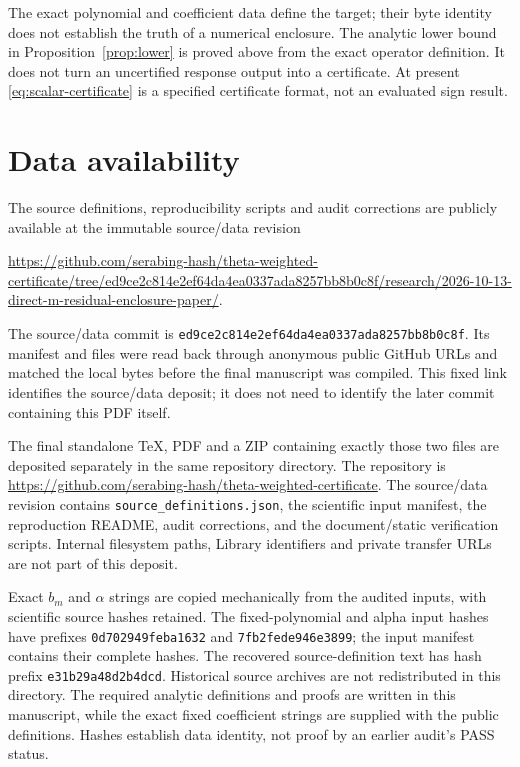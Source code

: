 \documentclass[11pt,a4paper]{article}
\theoremstyle{remark}
\numberwithin{equation}{section}
\begin{document}
The exact polynomial and coefficient data define the target; their byte
identity does not establish the truth of a numerical enclosure. The analytic
lower bound in Proposition~\ref{prop:lower} is proved above from the exact
operator definition. It does not turn an uncertified response output into
a certificate. At present \eqref{eq:scalar-certificate} is a specified
certificate format, not an evaluated sign result.

\section{Data availability}\label{sec:availability}
The source definitions, reproducibility scripts and audit corrections are
publicly available at the immutable source/data revision
\begin{center}
\url{https://github.com/serabing-hash/theta-weighted-certificate/tree/ed9ce2c814e2ef64da4ea0337ada8257bb8b0c8f/research/2026-10-13-direct-m-residual-enclosure-paper/}.
\end{center}
The source/data commit is
\texttt{ed9ce2c814e2ef64da4ea0337ada8257bb8b0c8f}.
Its manifest and files were read back through anonymous public GitHub URLs
and matched the local bytes before the final manuscript was compiled.
This fixed link identifies the source/data deposit; it does not need to
identify the later commit containing this PDF itself.

The final standalone TeX, PDF and a ZIP containing exactly those two files
are deposited separately in the same repository directory. The repository is
\url{https://github.com/serabing-hash/theta-weighted-certificate}.
The source/data revision contains \nolinkurl{source_definitions.json},
the scientific input manifest, the reproduction README, audit corrections,
and the document/static verification scripts. Internal filesystem paths,
Library identifiers and private transfer URLs are not part of this deposit.

Exact $b_m$ and $\alpha$ strings are copied mechanically from the audited
inputs, with scientific source hashes retained. The fixed-polynomial and
alpha input hashes have prefixes \texttt{0d702949feba1632} and
\texttt{7fb2fede946e3899}; the input manifest contains their complete hashes.
The recovered source-definition text has hash prefix
\texttt{e31b29a48d2b4dcd}. Historical source archives are not redistributed
in this directory. The required analytic definitions and proofs are written
in this manuscript, while the exact fixed coefficient strings are supplied
with the public definitions. Hashes establish data identity, not proof by
an earlier audit's PASS status.
\end{document}
